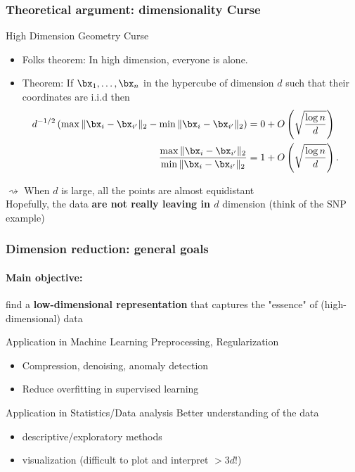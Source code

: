 \begin{frame}
\frametitle{Theoretical argument: dimensionality Curse}

\begin{block}{High Dimension Geometry Curse}
\begin{itemize}
\item Folks theorem: In high dimension, everyone is alone.
\item Theorem: If $\bx_1,\ldots, \bx_n$ in the
hypercube of dimension $d$  such
that their coordinates are i.i.d then
\begin{align*}
\mspace{-20mu} d^{-1/2} \left( \max \|\bx_i-\bx_{i'}\|_2 - \min \|\bx_i-\bx_{i'}\|_2
\right)  &= 0 + O\left(\sqrt{\frac{\log n}{d}}\right)\\
\frac{\max \|\bx_i-\bx_{i'}\|_2}{\min \|\bx_i-\bx_{i'}\|_2} &= 1 +
O\left(\sqrt{\frac{\log n}{d}}\right).
\end{align*}
\end{itemize}
\end{block}

  $\rightsquigarrow$ When $d$ is large, all the points are almost equidistant\\

  Hopefully, the data \alert{\bf are not really leaving in $d$} dimension (think of the SNP example)

\end{frame}

\begin{frame}[label=DimensionReduction]
  \frametitle{Dimension reduction: general goals}

  \paragraph{Main objective:} find a \alert{\bf low-dimensional representation} that captures the "essence" of (high-dimensional) data

  \vfill

  \begin{block}{Application in Machine Learning}
  \alert{Preprocessing, Regularization}
  \begin{itemize}
    \item Compression, denoising,  anomaly detection
    \item Reduce overfitting in supervised learning
  \end{itemize}
  \end{block}

\vfill

  \begin{block}{Application in Statistics/Data analysis}
    \alert{Better understanding of the data}
    \begin{itemize}
      \item descriptive/exploratory methods
      \item visualization (difficult to plot and interpret $> 3d$!)
    \end{itemize}
  \end{block}

\end{frame}

